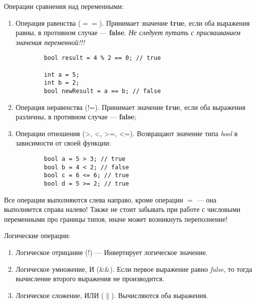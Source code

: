 Операции сравнения над переменными:
\begin{enumerate}
    \item Операция равенства ($==$). Принимает значение \textbf{true}, если оба выражения равны, в противном случае --- \textbf{false}. \textit{Не следует путать с присваиванием значения переменной!!!}
    
    \lstset{style=CPlusPlus}
    \begin{lstlisting}
        bool result = 4 % 2 == 0; // true
        
        int a = 5;
        int b = 2;
        bool newResult = a == b; // false 
    \end{lstlisting}    
    
    \item Операция неравенства (!=). Принимает значение \textbf{true}, если оба выражения различны, в противном случае --- \textbf{false};
    \item Операции отношения (>, <, >=, <=). Возвращают значение типа \textit{bool} в зависимости от своей функции:
    
    \lstset{style=CPlusPlus}
    \begin{lstlisting}
        bool a = 5 > 3; // true
        bool b = 4 < 2; // false
        bool c = 6 <= 6; // true
        bool d = 5 >= 2; // true
    \end{lstlisting}
\end{enumerate}

Все операции выполняются слева направо, кроме операции $=$ --- она выполняется справа налево! Также не стоит забывать при работе с числовыми переменными про границы типов, иначе может возникнуть переполнение!

\newpage

Логические операции:

\begin{enumerate}
    \item Логическое отрицание (!) --- Инвертирует логическое значение.
    \item Логическое умножение, И (\&\&). Если первое выражение равно \textit{false}, то тогда вычисление второго выражения не производится.
    \item Логическое сложение, ИЛИ ($\parallel$). Вычисляются оба выражения.
\end{enumerate}

